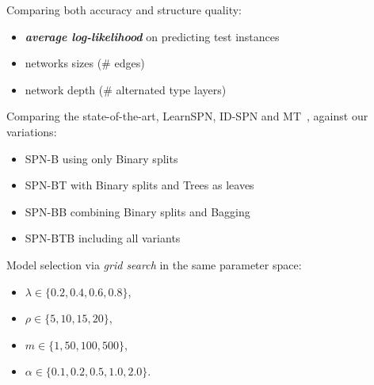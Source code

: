 \documentclass[final]{beamer}
\begin{document}
\begin{frame}{}
\begin{textblock}{25.2}
    Comparing both accuracy and structure quality:
    \begin{itemize}
    \item \emph{\textbf{average log-likelihood}} on predicting test
      instances
    \item networks sizes (\# edges)
    \item network depth (\# alternated type layers)

    \end{itemize}\bigskip
    
    Comparing the state-of-the-art, \textsf{LearnSPN},
    \textsf{ID-SPN} and \textsf{MT}~\parencite{Meila2000}, against our
    variations:
    
    \begin{itemize}
    \item \textsf{SPN-B} using only \textsf{B}inary splits
    \item \textsf{SPN-BT} with \textsf{B}inary splits and \textsf{T}rees as leaves
    \item \textsf{SPN-BB} combining \textsf{B}inary splits and \textsf{B}agging
      \item \textsf{SPN-BTB} including all variants
    \end{itemize}\bigskip
    
    Model selection via \textit{grid search} in the same parameter
    space:
    \begin{minipage}[t]{0.35\linewidth}
      \begin{itemize}
      \item $\lambda \in \{0.2, 0.4, 0.6, 0.8\}$,
      \item $\rho \in \{5, 10, 15, 20\}$, 
      \end{itemize}
    \end{minipage}\begin{minipage}[t]{0.5\linewidth}
      \begin{itemize}
      \item $m \in \{1, 50, 100, 500\}$, 
      \item $\alpha \in \{ 0.1, 0.2, 0.5, 1.0, 2.0\}$.
      \end{itemize}
    \end{minipage}


\end{textblock}
\end{frame}
\end{document}
